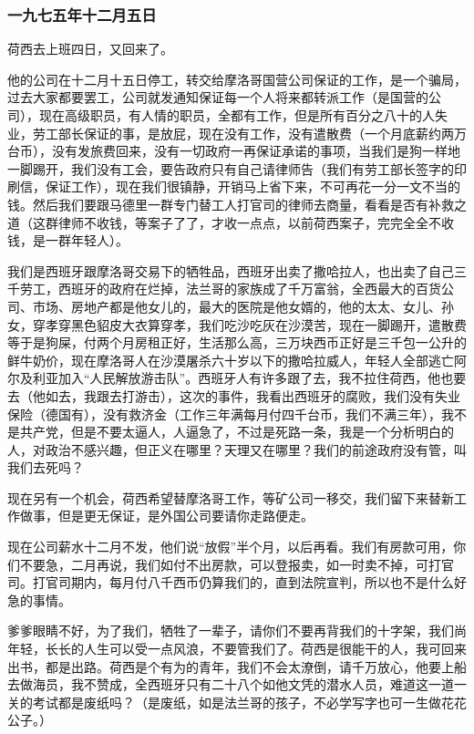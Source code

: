 \subsubsection{一九七五年十二月五日}

\par {}
\par 荷西去上班四日，又回来了。
\par 他的公司在十二月十五日停工，转交给摩洛哥国营公司保证的工作，是一个骗局，过去大家都要罢工，公司就发通知保证每一个人将来都转派工作（是国营的公司），现在高级职员，有人情的职员，全都有工作，但是所有百分之八十的人失业，劳工部长保证的事，是放屁，现在没有工作，没有遣散费（一个月底薪约两万台币），没有发旅费回来，没有一切政府一再保证承诺的事项，当我们是狗一样地一脚踢开，我们没有工会，要告政府只有自己请律师告（我们有劳工部长签字的印刷信，保证工作），现在我们很镇静，开销马上省下来，不可再花一分一文不当的钱。然后我们要跟马德里一群专门替工人打官司的律师去商量，看看是否有补救之道（这群律师不收钱，等案子了了，才收一点点，以前荷西案子，完完全全不收钱，是一群年轻人）。
\par 我们是西班牙跟摩洛哥交易下的牺牲品，西班牙出卖了撒哈拉人，也出卖了自己三千劳工，西班牙的政府在烂掉，法兰哥的家族成了千万富翁，全西最大的百货公司、市场、房地产都是他女儿的，最大的医院是他女婿的，他的太太、女儿、孙女，穿孝穿黑色貂皮大衣算穿孝，我们吃沙吃灰在沙漠苦，现在一脚踢开，遣散费等于是狗屎，付两个月房租正好，生活那么高，三万块西币正好是三千包一公升的鲜牛奶价，现在摩洛哥人在沙漠屠杀六十岁以下的撒哈拉威人，年轻人全部逃亡阿尔及利亚加入“人民解放游击队”。西班牙人有许多跟了去，我不拉住荷西，他也要去（他如去，我跟去打游击），这次的事件，我看出西班牙的腐败，我们没有失业保险（德国有），没有救济金（工作三年满每月付四千台币，我们不满三年），我不是共产党，但是不要太逼人，人逼急了，不过是死路一条，我是一个分析明白的人，对政治不感兴趣，但正义在哪里？天理又在哪里？我们的前途政府没有管，叫我们去死吗？
\par 现在另有一个机会，荷西希望替摩洛哥工作，等矿公司一移交，我们留下来替新工作做事，但是更无保证，是外国公司要请你走路便走。
\par 现在公司薪水十二月不发，他们说“放假”半个月，以后再看。我们有房款可用，你们不要急，二月再说，我们如付不出房款，可以登报卖，如一时卖不掉，可打官司。打官司期内，每月付八千西币仍算我们的，直到法院宣判，所以也不是什么好急的事情。
\par 爹爹眼睛不好，为了我们，牺牲了一辈子，请你们不要再背我们的十字架，我们尚年轻，长长的人生可以受一点风浪，不要管我们了。荷西是很能干的人，我可回来出书，都是出路。荷西是个有为的青年，我们不会太潦倒，请千万放心，他要上船去做海员，我不赞成，全西班牙只有二十八个如他文凭的潜水人员，难道这一道一关的考试都是废纸吗？（是废纸，如是法兰哥的孩子，不必学写字也可一生做花花公子。）
